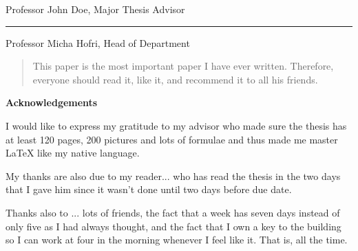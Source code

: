 \documentclass[12pt]{report}
\begin{document}
	Professor John Doe, Major Thesis Advisor
	
	\vspace{0.5in}
	\rule{3in}{0.8pt}
	
	Professor Micha Hofri, Head of Department	
	
	
	\newpage
	
	\doublespacing
	
	\begin{abstract}
		This paper is the most important paper I have ever written. Therefore,
		everyone should read it, like it, and recommend it to all his friends.
	\end{abstract}
	
	
	
	\begin{center}
		\textbf{Acknowledgements}
	\end{center}
	
	I would like to express my gratitude to my advisor who made
	sure the thesis has at least 120 pages, 200 pictures and lots
	of formulae and thus made me master \LaTeX{} like my native
	language.
	
	My thanks are also due to my reader... who has read the thesis
	in the two days that I gave him since it wasn't done until two
	days before due date.
	
	Thanks also to ... lots of friends, the fact that a week has
	seven days instead of only five as I had always thought, and
	the fact that I own a key to the building so I can work at four
	in the morning whenever I feel like it. That is, all the time.
	
\end{document}
